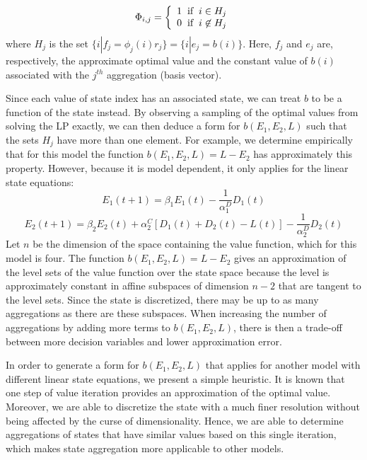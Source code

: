 \documentclass[conference]{IEEEtran}
\begin{document}
    \begin{displaymath}
        \Phi_{i,j}=\left\{
            \begin{array}{l}
            1 \hspace{0.2cm} \text{if} \hspace{0.2cm} i\in H_{j}\\
            0 \hspace{0.2cm} \text{if} \hspace{0.2cm} i\not\in H_{j}
            \end{array}
            \right.
    \end{displaymath}where $H_{j}$ is the set $\{i|f_{j} = \phi_{j}(i)r_{j}\}=\{i|e_{j} = b(i)\}$. Here, $f_{j}$ and $e_{j}$ are, respectively, the approximate optimal value and the constant value of $b(i)$ associated with the $j^{th}$ aggregation (basis vector).
    
    Since each value of state index has an associated state, we can treat $b$ to be a function of the state instead. By observing a sampling of the optimal values from solving the LP exactly, we can then deduce a form for $b(E_{1},E_{2},L)$ such that the sets $H_{j}$ have more than one element. For example, we determine empirically that for this model the function $b(E_{1},E_{2},L)=L-E_{2}$ has approximately this property. However, because it is model dependent, it only applies for the linear state equations:
	\begin{displaymath}E_{1}(t+1)=\beta_{1}E_{1}(t)-\frac{1}{\alpha_{1}^{D}}D_{1}(t)\end{displaymath}
	\begin{displaymath}E_{2}(t+1)=\beta_{2}E_{2}(t)+\alpha_{2}^{C}[D_{1}(t)+D_{2}(t)-L(t)]-\frac{1}{\alpha_{2}^{D}}D_{2}(t)\end{displaymath}	Let $n$ be the dimension of the space containing the value function, which for this model is four. The function $b(E_{1},E_{2},L)=L-E_{2}$ gives an approximation of the level sets of the value function over the state space because the level is approximately constant in affine subspaces of dimension $n-2$ that are tangent to the level sets. Since the state is discretized, there may be up to as many aggregations as there are these subspaces. When increasing the number of aggregations by adding more terms to $b(E_{1},E_{2},L)$, there is then a trade-off between more decision variables and lower approximation error. %
	
	In order to generate a form for $b(E_{1},E_{2},L)$ that applies for another model with different linear state equations, we present a simple heuristic. It is known that one step of value iteration provides an approximation of the optimal value. Moreover, we are able to discretize the state with a much finer resolution without being affected by the curse of dimensionality. Hence, we are able to determine aggregations of states that have similar values based on this single iteration, which makes state aggregation more applicable to other models.
    
\end{document}
